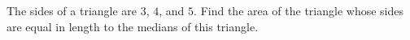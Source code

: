 The sides of a triangle are $3$, $4$, and $5$. Find the area of the triangle whose sides are equal in length to the medians of this triangle.
